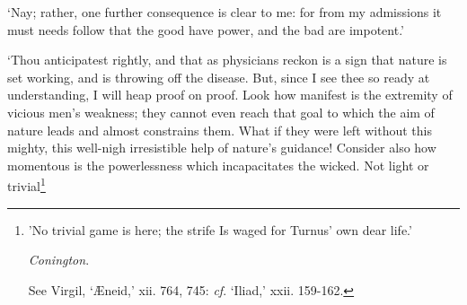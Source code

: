 \documentclass[11pt]{book}
\begin{document}
`Nay; rather, one further consequence is clear to me: for from my
admissions it must needs follow that the good have power, and the bad
are impotent.'

`Thou anticipatest rightly, and that as physicians \linebreak reckon is a sign that
nature is set working, and is throwing off the disease. But, since I see
thee so ready at understanding, I will heap proof on proof. Look how
manifest is the extremity of vicious men's weakness; they cannot even
reach that goal to which the aim of nature leads and almost constrains
them. What if they were left without this mighty, this well-nigh
irresistible help of nature's guidance! Consider also how momentous is
the powerlessness which incapacitates the wicked. Not light or
trivial\footnote{'No trivial game is here; the strife Is waged for Turnus' own dear life.'

\emph{Conington}.

See Virgil, `Æneid,' xii. 764, 745: \emph{cf}. `Iliad,' xxii. 159-162.}
\end{document}

